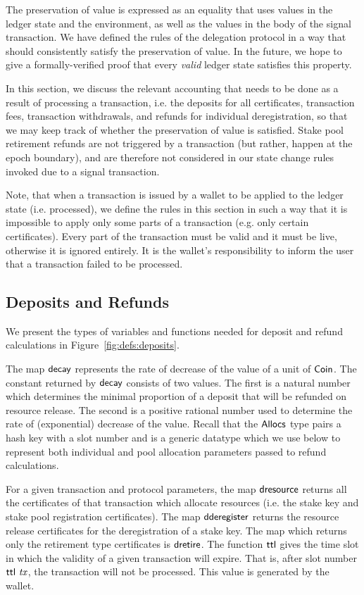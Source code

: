 \documentclass[11pt,a4paper,dvipsnames]{article}
\newcommand{\Coin}{\type{Coin}}
\newcommand{\Allocs}{\type{Allocs}}
\theoremstyle{definition}
\theoremstyle{definition}
\begin{document}
The preservation of value is expressed as an equality that uses values in
the ledger state and the environment, as well as the values in the body of
the signal transaction.
We have defined the rules of the delegation protocol in a way that should
consistently satisfy the preservation of value. In the future, we hope to
give a formally-verified proof that every \textit{valid} ledger state satisfies
this property.

In this section, we discuss the relevant accounting that needs to be done
as a result of processing a transaction, i.e. the deposits for all certificates,
transaction fees, transaction withdrawals, and refunds for individual
deregistration, so that we may keep track of whether the preservation of
value is satisfied. Stake pool retirement refunds are not triggered by a
transaction (but rather, happen at the epoch boundary), and are therefore
not considered in our state change rules invoked due to a signal transaction.

Note, that when a transaction is issued by a wallet to be applied to the ledger
state (i.e. processed),
we define the rules in this section in such a way that it is impossible to
apply only some parts of a transaction (e.g. only certain certificates).
Every part of the transaction must be valid and it must be live, otherwise
it is ignored entirely. It is the wallet's responsibility to inform the user
that a transaction failed to be processed.

\subsection{Deposits and Refunds}
\label{sec:deps-refunds}

We present the types of variables and functions needed for deposit and
refund calculations in Figure~\ref{fig:defs:deposits}.

The map $\mathsf{decay}$
represents the rate of decrease of the value of a unit of $\Coin$.
The constant returned by $\mathsf{decay}$ consists of two values. The first is
a natural number which determines the minimal proportion of a deposit that will
be refunded on resource release. The second is a positive rational number
used to determine the rate of (exponential) decrease of the value.
Recall that the $\Allocs$ type pairs a hash key with a slot number and is a generic datatype
which we use below to represent both individual and pool allocation
parameters passed to refund calculations.

For a given transaction and protocol parameters, the map $\mathsf{dresource}$
returns all the certificates of that transaction which allocate resources
(i.e. the stake key and stake pool registration certificates). The map
$\mathsf{dderegister}$ returns the resource release certificates for the
deregistration of a stake key. The map which returns only
the retirement type certificates is $\mathsf{dretire}$. The function $\mathsf{ttl}$ gives the
time slot in which the validity of a given transaction will expire. That is,
after slot number $\mathsf{ttl}~\mathit{tx}$, the transaction will not be processed.
This value is generated by the wallet.
\end{document}
